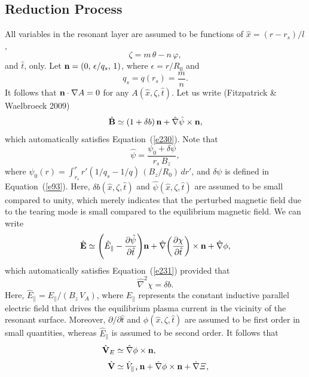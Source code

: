 \documentclass[notitlepage,12pt]{article}
\begin{document}
\subsection{Reduction Process} 
All variables in the resonant layer are assumed to be functions of 
$\hat{x}=(r-r_s)/l$,
 \begin{equation}
 \zeta=m\,\theta-n\,\varphi,
 \end{equation}
 and $\hat{t}$, 
 only. 
Let ${\bf n} = (0,\,\epsilon/q_s,\,1)$, where $\epsilon=r/R_0$ and 
\begin{equation}
q_s=q(r_s)= \frac{m}{n}.
\end{equation}
 It follows that ${\bf n}\cdot\nabla A=0$ for any $A(\hat{x},\zeta,\hat{t})$. 
Let us write (Fitzpatrick \& Waelbroeck 2009)
\begin{equation}\label{e238}
\hat{\bf B} \simeq (1+ \delta b)\,{\bf n} + \hat{\nabla}\hat{\psi}\times {\bf n},
\end{equation}
which automatically satisfies Equation~(\ref{e230}). Note that 
\begin{equation}\label{e247a}
\hat{\psi}=\frac{\psi_0+\delta\psi}{r_s\,B_z},
\end{equation}
 where $\psi_0(r) = \int_{r_s}^r r'(1/q_s-1/q)\,(B_z/R_0)\,dr'$, and $\delta\psi$ is defined in Equation~(\ref{e93}).
 Here, $\delta b(\hat{x},\zeta,
 \hat{t})$ and $\hat{\psi}(\hat{x},\zeta,\hat{t})$ are assumed to be small
compared to unity, which merely indicates that the perturbed magnetic field due to the tearing mode is small compared to the
equilibrium magnetic field.  We can write
\begin{equation}
\hat{\bf E} \simeq \left(\hat{E}_\parallel- \frac{\partial \hat{\psi}}{\partial \hat{t}}\right)\!{\bf n} + \hat{\nabla}\!\left(\frac{\partial\chi}{\partial \hat{t}}\right)\times {\bf n} + \hat{\nabla}\phi,
\end{equation}
which automatically satisfies Equation~(\ref{e231}) provided that
\begin{equation}
\hat{\nabla}^2\chi =\delta b.
\end{equation}
Here, $\hat{E}_\parallel = E_\parallel/(B_z\,V_A)$, where $E_\parallel$ represents the constant inductive parallel electric field that drives the equilibrium plasma current in the vicinity of the resonant surface. Moreover, $\partial/\partial \hat{t}$ and $\phi(\hat{x},\zeta,\hat{t})$
are 
assumed to be first order in small quantities, whereas $\hat{E}_\parallel$ is assumed to be second order. 
It follows that
\begin{align}
\hat{\bf V}_E &\simeq \hat{\nabla}\phi\times {\bf n},\\[0.5ex]
\hat{\bf V} &\simeq \hat{V}_{\parallel\,i}\,{\bf n}+  \hat{\nabla}\phi\times {\bf n}+\hat{\nabla}{\mit\Xi},
\end{align}
\end{document}
